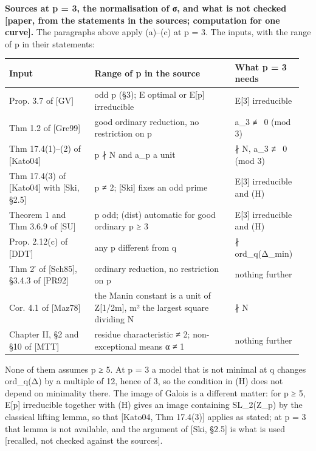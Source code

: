 \documentclass[11pt,a4paper]{article}
\theoremstyle{named}
\begin{document}
\textbf{Sources at p = 3, the normalisation of σ, and what is not checked [paper, from the statements in the sources; computation for one curve].} The paragraphs above apply (a)–(c) at p = 3. The inputs, with the range of p in their statements:

\begin{center}\begin{small}
\begin{tabular}{>{\raggedright\arraybackslash}p{0.289\linewidth}>{\raggedright\arraybackslash}p{0.464\linewidth}>{\raggedright\arraybackslash}p{0.205\linewidth}}
\hline
Input & Range of p in the source & What p = 3 needs \\
\hline
Prop. 3.7 of [GV] & odd p (§3); E optimal or E[p] irreducible & E[3] irreducible \\
Thm 1.2 of [Gre99] & good ordinary reduction, no restriction on p & a\_3 ≢ 0 (mod 3) \\
Thm 17.4(1)–(2) of [Kato04] & p ∤ N and a\_p a unit & 3 ∤ N, a\_3 ≢ 0 (mod 3) \\
Thm 17.4(3) of [Kato04] with [Ski, §2.5] & p ≠ 2; [Ski] fixes an odd prime & E[3] irreducible and (H) \\
Theorem 1 and Thm 3.6.9 of [SU] & p odd; (dist) automatic for good ordinary p ≥ 3 & E[3] irreducible and (H) \\
Prop. 2.12(c) of [DDT] & any p different from q & 3 ∤ ord\_q(Δ\_min) \\
Thm 2′ of [Sch85], §3.4.3 of [PR92] & ordinary reduction, no restriction on p & nothing further \\
Cor. 4.1 of [Maz78] & the Manin constant is a unit of Z[1/2m], m² the largest square dividing N & 3 ∤ N \\
Chapter II, §2 and §10 of [MTT] & residue characteristic ≠ 2; non-exceptional means α ≠ 1 & nothing further \\
\hline
\end{tabular}
\end{small}\end{center}

None of them assumes p ≥ 5. At p = 3 a model that is not minimal at q changes ord\_q(Δ) by a multiple of 12, hence of 3, so the condition in (H) does not depend on minimality there. The image of Galois is a different matter: for p ≥ 5, E[p] irreducible together with (H) gives an image containing SL\_2(Z\_p) by the classical lifting lemma, so that [Kato04, Thm 17.4(3)] applies as stated; at p = 3 that lemma is not available, and the argument of [Ski, §2.5] is what is used [recalled, not checked against the sources].
\end{document}
